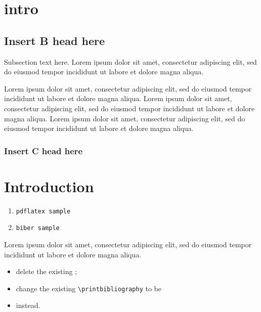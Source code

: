 \documentclass[twocolumn]{article}
\begin{document}
\section{intro}
\subsection{Insert B head here}
Subsection text here. Lorem ipsum 
\citep{Bayer_etal_2013}
dolor sit amet, consectetur adipiscing elit, 
sed do eiusmod tempor incididunt ut labore 
\citet{Adade_etal_2007} et dolore magna aliqua. 

 Lorem ipsum dolor sit amet, consectetur adipiscing elit, sed do eiusmod tempor incididunt ut labore et dolore magna aliqua. Lorem ipsum dolor sit amet, consectetur adipiscing elit, sed do eiusmod tempor incididunt ut labore et dolore magna aliqua. Lorem ipsum dolor sit amet, consectetur adipiscing elit, sed do eiusmod tempor incididunt ut labore et dolore magna aliqua. 

\subsubsection{Insert C head here}

\section{Introduction}
\begin{enumerate}
    \item \verb|pdflatex sample|
    \item \verb|biber sample|
\end{enumerate}
\noindent Lorem ipsum dolor sit amet, consectetur adipiscing elit, sed do eiusmod tempor incididunt ut labore et dolore magna aliqua. 
\begin{itemize}
    \item delete the existing \verb||;
    \item change the existing \verb|\printbibliography| to be 
    \item \verb|| instead.
\end{itemize}
\end{document}

